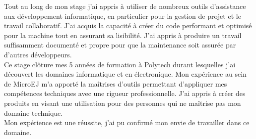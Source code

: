 \documentclass[french,a4paper,12pt]{report}
\begin{document}
Tout au long de mon stage j’ai appris à utiliser de nombreux outils d’assistance aux développement informatique, en particulier pour la gestion de projet et le travail collaboratif. J'ai acquis la capacité à créer du code performant et optimisé pour la machine tout en assurant sa lisibilité. J'ai appris à produire un travail suffisamment documenté et propre pour que la maintenance soit assurée par d'autres développeurs.\\

Ce stage clôture mes 5 années de formation à Polytech durant lesquelles j'ai découvert les domaines informatique et en électronique. 
Mon expérience au sein de MicroEJ m’a apporté la maîtrises d'outils permettant d'appliquer mes compétences techniques avec une rigueur professionnelle. J'ai appris à créer des produits en visant une utilisation pour des personnes qui ne maîtrise pas mon domaine technique.\\ 

Mon expérience est une réussite, j'ai pu confirmé mon envie de travailler dans ce domaine.
\end{document}
